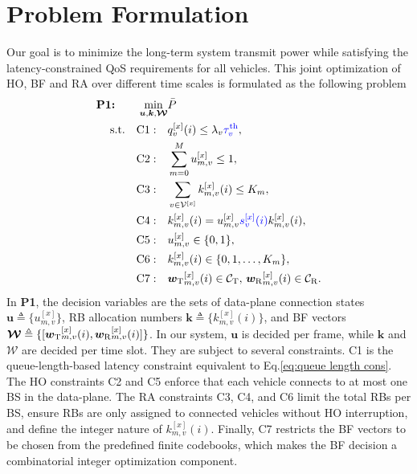 \documentclass[10pt,journal,letterpaper]{journal_template/IEEEtran}
\newcommand{\rev}[1]{\textcolor{revisioncolor}{{}#1}}
\newif\ifshowdeletions
\newcommand{\currentdel}[1]{\ifshowdeletions\textcolor{deletioncolor}{\sout{#1}}\fi}
\theoremstyle{remark}
\begin{document}
\section{Problem Formulation}{\label{sec:Problem Formulation}}

Our goal is to minimize the long-term system transmit power while satisfying the latency-constrained QoS requirements for all vehicles. This joint optimization of HO, BF and RA over different time scales is formulated as the following problem 
\begin{equation}
    \label{prob1}
    \begin{aligned}
        \textbf{P1:} \qquad  \min_{\bm{u},\bm{k}, \bm{\mathcal{W}}} & \bar{P} \\
        \textup{s.t.} \quad 
        \textup{C1}: \quad & q_v^{[x]}(i) \leq \lambda_v \text{\currentdel{$\tau^{{\rm th}}$}}\rev{\tau_v^{\rm th}}, \\
        \textup{C2}: \quad & \sum_{m=0}^{M} u_{m,v}^{[x]} \leq 1, \\
        \textup{C3}: \quad & \sum_{v\in\mathcal{V}^{[x]}} k_{m,v}^{[x]}(i) \leq K_m, \\
        \textup{C4}: \quad & k_{m,v}^{[x]}(i) = u_{m,v}^{[x]}\rev{s_v^{[x]}(i)}k_{m,v}^{[x]}(i), \\
        \textup{C5}: \quad & u_{m,v}^{[x]} \in \{0,1\}, \\
        \textup{C6}: \quad & k_{m,v}^{[x]}(i) \in \{0,1,\dots,K_m\}, \\
        \textup{C7}: \quad & {\bm{w}_{\rm T}}_{m,v}^{[x]}(i) \in \mathcal{C}_{\rm T}, \, {\bm{w}_{\rm R}}_{m,v}^{[x]}(i) \in \mathcal{C}_{\rm R}.
    \end{aligned}
\end{equation}
In \textbf{P1}, the decision variables are the sets of data-plane connection states $\bm{u} \triangleq \{ u_{m,v}^{[x]} \}$, RB allocation numbers $\bm{k} \triangleq \{ k_{m,v}^{[x]}(i) \}$, and BF vectors $\bm{\mathcal{W}} \triangleq \{ [{\bm{w}_{\rm T}}_{m,v}^{[x]}(i), {\bm{w}_{\rm R}}_{m,v}^{[x]}(i)] \}$. 
In our system, $\bm{u}$ is decided per frame, while $\bm{k}$ and $\bm{\mathcal{W}}$ are decided per time slot.
They are subject to several constraints. 
{C1} is the queue-length-based latency constraint equivalent to Eq.\eqref{eq:queue length cons}. 
The HO constraints {C2} and {C5} enforce that each vehicle connects to at most one BS in the data-plane. 
The RA constraints {C3}, {C4}, and {C6} limit the total RBs per BS, ensure RBs are only assigned to connected vehicles\rev{ without HO interruption}, and define the integer nature of $k_{m,v}^{[x]}(i)$. 
Finally, {C7} restricts the BF vectors to be chosen from the predefined finite codebooks, which makes the BF decision a combinatorial integer optimization component.
\end{document}
